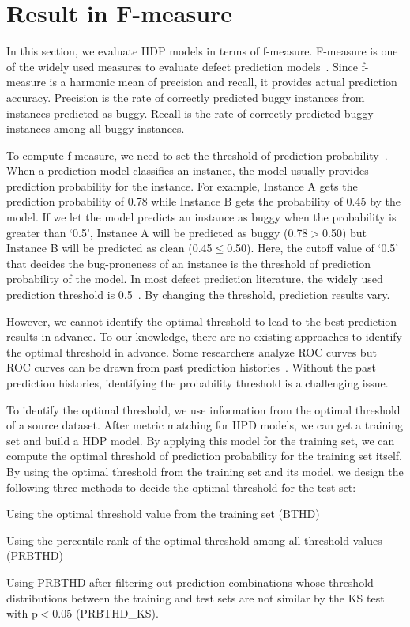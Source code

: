 \section{Result in F-measure}
In this section, we evaluate HDP models in terms of f-measure. F-measure is one of the widely used measures to evaluate defect prediction models~\cite{Lee11,Rahman13,Fukushima14,Herzig13,Jing14}. Since f-measure is a harmonic mean of precision and recall, it provides actual prediction accuracy. Precision is the rate of correctly predicted buggy instances from instances predicted as buggy. Recall is the rate of correctly predicted buggy instances among all buggy instances.

To compute f-measure, we need to set the threshold of prediction probability~\cite{Lessmann08,Rahman12}. When a prediction model classifies an instance, the model usually provides prediction probability for the instance. For example, Instance A gets the prediction probability of 0.78 while Instance B gets the probability of 0.45 by the model. If we let the model predicts an instance as buggy when the probability is greater than `0.5', Instance A will be predicted as buggy (0.78$>$0.50) but Instance B will be predicted as clean (0.45$\leq$0.50). Here, the cutoff value of `0.5' that decides the bug-proneness of an instance is the threshold of prediction probability of the model. In most defect prediction literature, the widely used prediction threshold is 0.5~\cite{Lee11,Rahman13,Herzig13,Zimmermann09}. By changing the threshold, prediction results vary.

However, we cannot identify the optimal threshold to lead to the best prediction results in advance. To our knowledge, there are no existing approaches to identify the optimal threshold in advance. Some researchers analyze ROC curves but ROC curves can be drawn from past prediction histories~\cite{Fawcett06,Tosun09}. Without the past prediction histories, identifying the probability threshold is a challenging issue.

To identify the optimal threshold, we use information from the optimal threshold of a source dataset. After metric matching for HPD models, we can get a training set and build a HDP model. By applying this model for the training set, we can compute the optimal threshold of prediction probability for the training set itself. By using the optimal threshold from the training set and its model, we design the following three methods to decide the optimal threshold for the test set:
\squishlist
\item Using the optimal threshold value from the training set (BTHD)
\item Using the percentile rank of the optimal threshold among all threshold values (PRBTHD)
\item Using PRBTHD after filtering out prediction combinations whose threshold distributions between the training and test sets are not similar by the KS test with p$<$0.05 (PRBTHD\_KS).
\squishend

